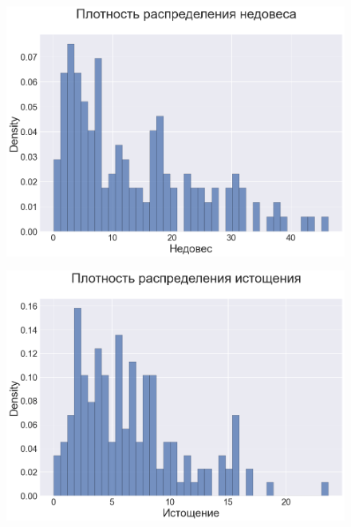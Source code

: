 \documentclass{beamer}
\begin{document}
\begin{frame}

\begin{figure}
	\centering
	\includegraphics[width=120mm]{4.png}
\end{figure}


\end{frame}



\begin{frame}

\begin{figure}
	\centering
	\includegraphics[width=120mm]{5.png}
\end{figure}


\end{frame}
\end{document}
